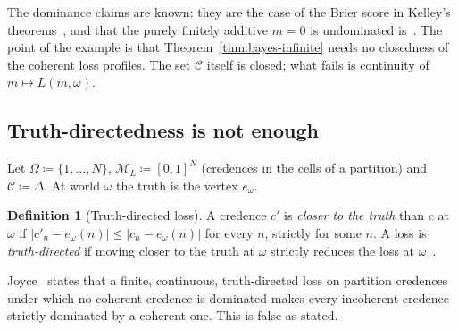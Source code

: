 \documentclass[11pt]{article}
\theoremstyle{definition}
\newtheorem{definition}[theorem]{Definition}
\theoremstyle{remark}
\newcommand{\M}{\mathcal M}
\newcommand{\C}{\mathcal C}
\begin{document}
The dominance claims are known: they are the case of the Brier score in Kelley's theorems~\cite[Theorems~3.4 and~4.26]{Kelley}, and that the purely finitely additive $m=0$ is undominated is~\cite[Example~3]{SSK14}. The point of the example is that Theorem~\ref{thm:bayes-infinite} needs no closedness of the coherent loss profiles. The set $\C$ itself is closed; what fails is continuity of $m\mapsto L(m,\omega)$.

\subsection{Truth-directedness is not enough}\label{sec:joyce}
Let $\Omega\coloneqq\{1,\dots,N\}$, $\M_L\coloneqq[0,1]^N$ (credences in the cells of a partition) and $\C\coloneqq\Delta$. At world $\omega$ the truth is the vertex $e_\omega$.

\begin{definition}[Truth-directed loss]\label{def:truth-directed}
A credence $c'$ is \emph{closer to the truth} than $c$ at $\omega$ if $|c'_n-e_\omega(n)|\le|c_n-e_\omega(n)|$ for every $n$, strictly for some $n$. A loss is \emph{truth-directed} if moving closer to the truth at $\omega$ strictly reduces the loss at $\omega$~\cite[p.~269]{Joyce}.
\end{definition}

Joyce~\cite[Theorem~2, pp.~287--288]{Joyce} states that a finite, continuous, truth-directed loss on partition credences under which no coherent credence is dominated makes every incoherent credence strictly dominated by a coherent one. This is false as stated.
\end{document}
